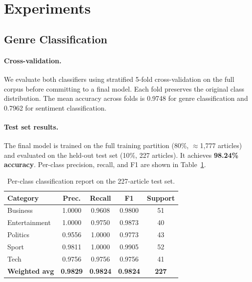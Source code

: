 \section{Experiments}
\label{sec:experiments}

\subsection{Genre Classification}

\paragraph{Cross-validation.}
We evaluate both classifiers using stratified 5-fold cross-validation on the full corpus before committing to a final model. Each fold preserves the original class distribution. The mean accuracy across folds is 0.9748 for genre classification and 0.7962 for sentiment classification.

\paragraph{Test set results.}
The final model is trained on the full training partition (80\%, $\approx$1,777 articles) and evaluated on the held-out test set (10\%, 227 articles). It achieves \textbf{98.24\% accuracy}. Per-class precision, recall, and F1 are shown in Table~\ref{tab:classification_report}.

\begin{table}[h]
\centering
\begin{tabular}{lcccc}
\toprule
\textbf{Category} & \textbf{Prec.} & \textbf{Recall} & \textbf{F1} & \textbf{Support} \\
\midrule
Business      & 1.0000 & 0.9608 & 0.9800 & 51 \\
Entertainment & 1.0000 & 0.9750 & 0.9873 & 40 \\
Politics      & 0.9556 & 1.0000 & 0.9773 & 43 \\
Sport         & 0.9811 & 1.0000 & 0.9905 & 52 \\
Tech          & 0.9756 & 0.9756 & 0.9756 & 41 \\
\midrule
\textbf{Weighted avg} & \textbf{0.9829} & \textbf{0.9824} & \textbf{0.9824} & \textbf{227} \\
\bottomrule
\end{tabular}
\caption{Per-class classification report on the 227-article test set.}
\label{tab:classification_report}
\end{table}

